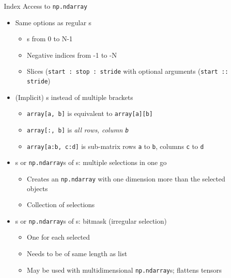 \begin{frame}[fragile]{Index Access to \texttt{np.ndarray}}
%
\begin{itemize}
\item Same options as regular s
	\begin{itemize}
	\item {}s from 0 to N-1
	\item Negative indices from -1 to -N
	\item Slices (\texttt{start : stop : stride} with optional arguments (\texttt{start :: stride})
	\end{itemize}
\item (Implicit) s instead of multiple brackets
	\begin{itemize}
	\item \texttt{array[a, b]} is equivalent to \texttt{array[a][b]}
	\item \texttt{array[:, b]} is \emph{all rows, column \texttt{b}}
	\item \texttt{array[a:b, c:d]} is sub-matrix rows \texttt{a} to \texttt{b}, columns \texttt{c} to \texttt{d}
	\end{itemize}
\item {}s or \texttt{np.ndarray}s of s: multiple selections in one go
	\begin{itemize}
	\item Creates an \texttt{np.ndarray} with one dimension more than the selected objects
	\item[\Thus] Collection of selections
	\end{itemize}
\item {}s or \texttt{np.ndarray}s of s: bitmask (irregular selection)
	\begin{itemize}
	\item One  for each selected
	\item Needs to be of same length as list
	\item May be used with multidimensional \texttt{np.ndarray}s; flattens tensors
	\end{itemize}
\end{itemize}
%
\end{frame}


